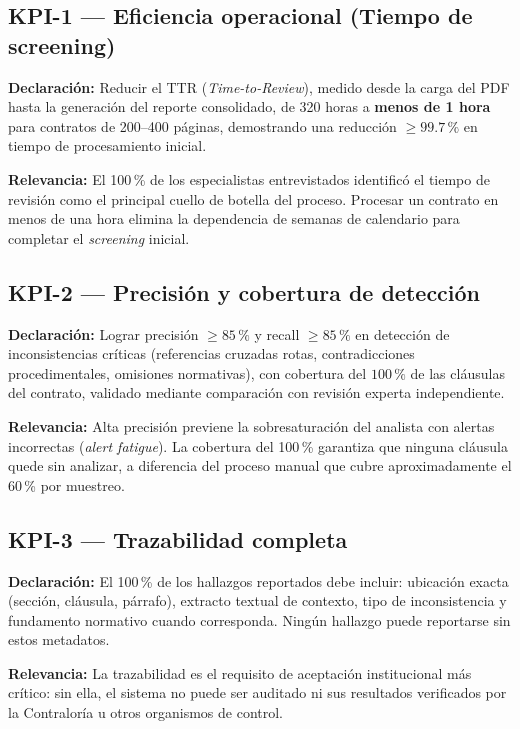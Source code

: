 \newpage

\subsection{KPI-1 — Eficiencia operacional (Tiempo de screening)}

\textbf{Declaración:} Reducir el TTR (\textit{Time-to-Review}), medido desde la
carga del PDF hasta la generación del reporte consolidado, de 320 horas a
\textbf{menos de 1 hora} para contratos de 200--400 páginas, demostrando una
reducción $\geq 99.7\,\text{\%}$ en tiempo de procesamiento inicial.

\textbf{Relevancia:} El 100\,\% de los especialistas entrevistados identificó
el tiempo de revisión como el principal cuello de botella del proceso. Procesar
un contrato en menos de una hora elimina la dependencia de semanas de calendario
para completar el \textit{screening} inicial.

\subsection{KPI-2 — Precisión y cobertura de detección}

\textbf{Declaración:} Lograr precisión $\geq 85\,\text{\%}$ y recall $\geq 85\,\text{\%}$
en detección de inconsistencias críticas (referencias cruzadas rotas,
contradicciones procedimentales, omisiones normativas), con cobertura del
$100\,\text{\%}$ de las cláusulas del contrato, validado mediante comparación con
revisión experta independiente.

\textbf{Relevancia:} Alta precisión previene la sobresaturación del analista
con alertas incorrectas (\textit{alert fatigue}). La cobertura del 100\,\%
garantiza que ninguna cláusula quede sin analizar, a diferencia del proceso
manual que cubre aproximadamente el 60\,\% por muestreo.

\subsection{KPI-3 — Trazabilidad completa}

\textbf{Declaración:} El 100\,\% de los hallazgos reportados debe incluir:
ubicación exacta (sección, cláusula, párrafo), extracto textual de contexto,
tipo de inconsistencia y fundamento normativo cuando corresponda. Ningún
hallazgo puede reportarse sin estos metadatos.

\textbf{Relevancia:} La trazabilidad es el requisito de aceptación institucional
más crítico: sin ella, el sistema no puede ser auditado ni sus resultados
verificados por la Contraloría u otros organismos de control.

